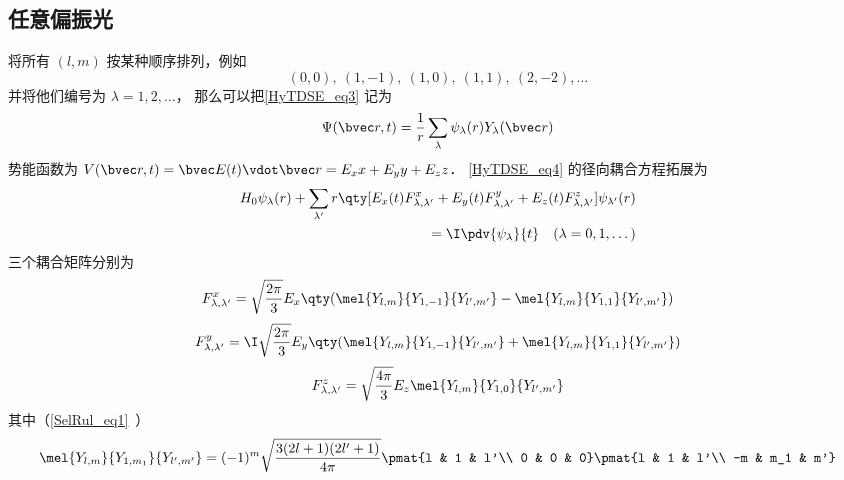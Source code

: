 \subsection{任意偏振光}
将所有 $(l,m)$ 按某种顺序排列，例如
\begin{equation}
(0, 0),\ (1,-1),\ (1,0),\ (1,1),\ (2,-2), \dots
\end{equation}
并将他们编号为 $\lambda = 1,2, \dots$， 那么可以把\autoref{HyTDSE_eq3} 记为
\begin{equation}
\Psi(\bvec r, t) = \frac{1}{r}\sum_\lambda \psi_\lambda(r) Y_\lambda(\bvec r)
\end{equation}
势能函数为 $V(\bvec r, t) = \bvec E(t) \vdot \bvec r  = E_x x + E_y y + E_z z$．
\autoref{HyTDSE_eq4} 的径向耦合方程拓展为
\begin{equation}
\begin{aligned}
H_0 \psi_{\lambda}(r) + \sum_{\lambda'} r \qty[E_x(t) F_{\lambda, \lambda'}^{x} + E_y(t) F_{\lambda, \lambda'}^{y} + E_z(t) F_{\lambda, \lambda'}^{z}] \psi_{\lambda'}(r) \\
= \I \pdv{\psi_{\lambda}}{t} \quad (\lambda=0,1,\dots)
\end{aligned}
\end{equation}
三个耦合矩阵分别为
\begin{equation}
\begin{aligned}
F_{\lambda,\lambda'}^{x} = \sqrt{\frac{2\pi}{3}} E_x \qty(\mel{Y_{l,m}}{Y_{1,-1}}{Y_{l',m'}} - \mel{Y_{l,m}}{Y_{1,1}}{Y_{l',m'}})
\end{aligned}
\end{equation}
\begin{equation}
\begin{aligned}
F_{\lambda,\lambda'}^{y} = \I\sqrt{\frac{2\pi}{3}} E_y \qty(\mel{Y_{l,m}}{Y_{1,-1}}{Y_{l',m'}} + \mel{Y_{l,m}}{Y_{1,1}}{Y_{l',m'}})
\end{aligned}
\end{equation}
\begin{equation}
\begin{aligned}
F_{\lambda,\lambda'}^{z} = \sqrt{\frac{4\pi}{3}} E_z \mel{Y_{l,m}}{Y_{1,0}}{Y_{l',m'}}
\end{aligned}
\end{equation}
其中（\autoref{SelRul_eq1}~）
\begin{equation}
\mel{Y_{l,m}}{Y_{1,m_1}}{Y_{l',m'}} = (-1)^m\sqrt{\frac{3(2l+1)(2l'+1)}{4\pi}} \pmat{l & 1 & l'\\ 0 & 0 & 0}\pmat{l & 1 & l'\\ -m & m_1 & m'}
\end{equation}

